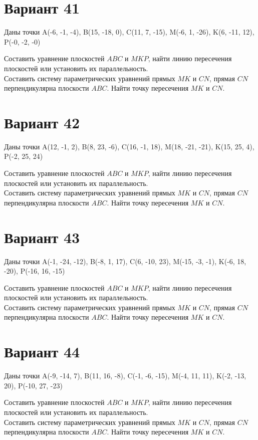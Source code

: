 \documentclass[11pt]{article}
\begin{document}
\section*{Вариант 41}
Даны точки A(-6, -1, -4), B(15, -18, 0), C(11, 7, -15), M(-6, 1, -26), K(6, -11, 12), P(-0, -2, -0)

Составить уравнение плоскостей $ABC$ и $MKP$, найти линию пересечения плоскостей или установить их параллельность.\\
Составить систему параметрических уравнений прямых $MK$ и $CN$, прямая $CN$ перпендикулярна плоскости $ABC$. Найти точку пересечения $MK$ и $CN$.

\section*{Вариант 42}
Даны точки A(12, -1, 2), B(8, 23, -6), C(16, -1, 18), M(18, -21, -21), K(15, 25, 4), P(-2, 25, 24)

Составить уравнение плоскостей $ABC$ и $MKP$, найти линию пересечения плоскостей или установить их параллельность.\\
Составить систему параметрических уравнений прямых $MK$ и $CN$, прямая $CN$ перпендикулярна плоскости $ABC$. Найти точку пересечения $MK$ и $CN$.

\section*{Вариант 43}
Даны точки A(-1, -24, -12), B(-8, 1, 17), C(6, -10, 23), M(-15, -3, -1), K(-6, 18, -20), P(-16, 16, -15)

Составить уравнение плоскостей $ABC$ и $MKP$, найти линию пересечения плоскостей или установить их параллельность.\\
Составить систему параметрических уравнений прямых $MK$ и $CN$, прямая $CN$ перпендикулярна плоскости $ABC$. Найти точку пересечения $MK$ и $CN$.

\section*{Вариант 44}
Даны точки A(-9, -14, 7), B(11, 16, -8), C(-1, -6, -15), M(-4, 11, 11), K(-2, -13, 20), P(-10, 27, -23)

Составить уравнение плоскостей $ABC$ и $MKP$, найти линию пересечения плоскостей или установить их параллельность.\\
Составить систему параметрических уравнений прямых $MK$ и $CN$, прямая $CN$ перпендикулярна плоскости $ABC$. Найти точку пересечения $MK$ и $CN$.
\end{document}
